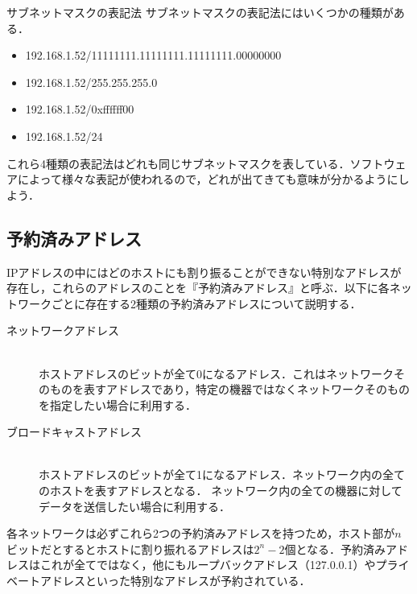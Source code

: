 \begin{itembox}[c]{サブネットマスクの表記法}
サブネットマスクの表記法にはいくつかの種類がある．
\begin{itemize}
    \item 192.168.1.52/11111111.11111111.11111111.00000000
    \item 192.168.1.52/255.255.255.0
    \item 192.168.1.52/0xffffff00
    \item 192.168.1.52/24
\end{itemize}
これら4種類の表記法はどれも同じサブネットマスクを表している．ソフトウェアによって様々な表記が使われるので，どれが出てきても意味が分かるようにしよう．
\end{itembox}

\subsection{予約済みアドレス}
IPアドレスの中にはどのホストにも割り振ることができない特別なアドレスが存在し，これらのアドレスのことを『予約済みアドレス』と呼ぶ．以下に各ネットワークごとに存在する2種類の予約済みアドレスについて説明する．

\begin{screen}
\begin{description}
 \item[ネットワークアドレス]\mbox{}\\ 
	    ホストアドレスのビットが全て0になるアドレス．これはネットワークそのものを表すアドレスであり，特定の機器ではなくネットワークそのものを指定したい場合に利用する．\\
 \item[ブロードキャストアドレス]\mbox{}\\
	    ホストアドレスのビットが全て1になるアドレス．ネットワーク内の全てのホストを表すアドレスとなる． ネットワーク内の全ての機器に対してデータを送信したい場合に利用する．\\
\end{description}
\end{screen}

各ネットワークは必ずこれら2つの予約済みアドレスを持つため，ホスト部が\(n\)ビットだとするとホストに割り振れるアドレスは\(2^n-2\)個となる．予約済みアドレスはこれが全てではなく，他にもループバックアドレス（127.0.0.1）やプライベートアドレスといった特別なアドレスが予約されている．

